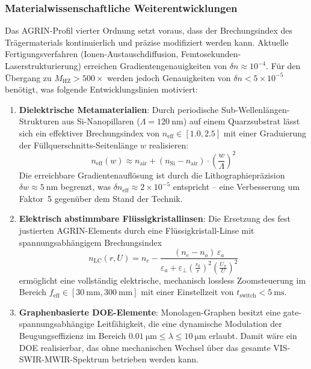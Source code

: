 ﻿\documentclass[12pt,a4paper]{article}
\theoremstyle{definition}
\newcommand{\HZ}{\mathrm{HZ}}
\newcommand{\eff}{\mathrm{eff}}
\begin{document}
	\subsubsection{Materialwissenschaftliche Weiterentwicklungen}

	Das AGRIN-Profil vierter Ordnung setzt voraus, dass der
	Brechungsindex des Trägermaterials kontinuierlich und präzise
	modifiziert werden kann.  Aktuelle Fertigungsverfahren
	(Ionen-Austauschdiffusion, Femtosekunden-Laserstrukturierung)
	erreichen Gradientengenauigkeiten von $\delta n \approx 10^{-4}$.
	Für den Übergang zu $M_\HZ > 500\times$ werden jedoch
	Genauigkeiten von $\delta n < 5\times10^{-5}$ benötigt, was
	folgende Entwicklungslinien motiviert:

	\begin{enumerate}[label=(\roman*)]
		\item \textbf{Dielektrische Metamaterialien}: Durch periodische
		Sub-Wellenlängen-Struktu\-ren aus Si-Nanopillaren
		($\Lambda = \SI{120}{\nano\metre}$) auf einem Quarzsubstrat
		lässt sich ein effektiver Brechungsindex von $n_\eff \in [1.0, 2.5]$
		mit einer Graduierung der Füllquerschnitts-Seitenlänge $w$ realisieren:
		\begin{equation}
			n_\eff(w)
			\approx n_\mathrm{air} + (n_\mathrm{Si} - n_\mathrm{air})
			\cdot\left(\frac{w}{\Lambda}\right)^2
			\label{eq:meta_neff}
		\end{equation}
		Die erreichbare Gradientenauflösung ist durch die
		Lithographiepräzision $\delta w \approx \SI{5}{\nano\metre}$
		begrenzt, was $\delta n_\eff \approx 2\times10^{-5}$ entspricht
		-- eine Verbesserung um Faktor~5 gegenüber dem Stand der Technik.

		\item \textbf{Elektrisch abstimmbare Flüssigkristallinsen}: Die
		Ersetzung des fest justierten AGRIN-Elements durch eine
		Flüssigkristall-Linse mit spannungsabhängigem Brechungsindex
		\begin{equation}
			n_\mathrm{LC}(r, U)
			= n_e -
			\frac{(n_e - n_o)\,\varepsilon_a}{\varepsilon_a
				+ \varepsilon_\perp\!\left(\frac{r_0}{r}\right)^2\!
				\left(\frac{U_\pi}{U}\right)^2}
			\label{eq:lc_index}
		\end{equation}
		ermöglicht eine vollständig elektrische, mechanisch lossless
		Zoomsteuerung im Bereich $f_\eff \in [\SI{30}{\milli\metre},
		\SI{300}{\milli\metre}]$ mit einer Einstellzeit von
		$t_\mathrm{switch} < \SI{5}{\milli\second}$.

		\item \textbf{Graphenbasierte DOE-Elemente}: Monolagen-Graphen
		besitzt eine gate-span\-nungsabhängige Leitfähigkeit, die eine
		dynamische Modulation der Beugungseffizienz im Bereich
		$\SI{0.01}{\micro\metre} \leq \lambda \leq \SI{10}{\micro\metre}$
		erlaubt.  Damit wäre ein DOE realisierbar, das ohne mechanischen
		Wechsel über das gesamte VIS-SWIR-MWIR-Spektrum betrieben
		werden kann.
	\end{enumerate}
\end{document}
